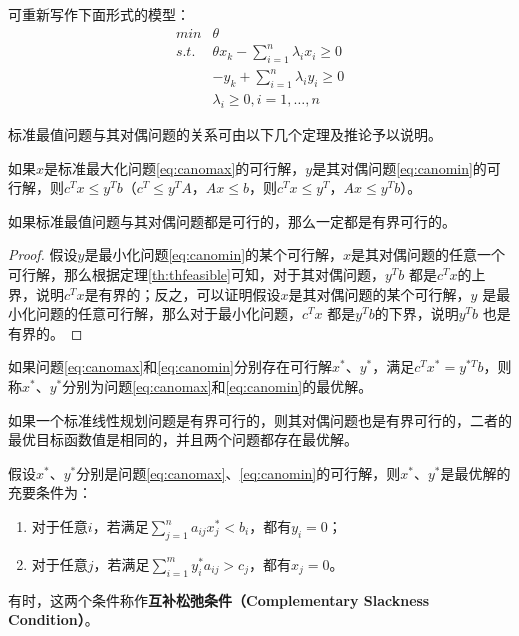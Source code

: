 \begin{shaded}
可重新写作下面形式的模型：
\begin{equation}
\begin{array}{ll}
  \textit{min} & \theta\\
  \textit{s.t.} & \theta x_k - \sum\limits_{i = 1}^n \lambda_i x_i \ge 0 \\
   & -y_k + \sum\limits_{i = 1}^n \lambda_i y_i \ge 0\\
   & \lambda_i \ge 0, i = 1, \ldots, n
\end{array}
\end{equation}
\end{shaded}

标准最值问题与其对偶问题的关系可由以下几个定理及推论予以说明。

\begin{theorem}\label{th:thfeasible}
如果$x$是标准最大化问题\eqref{eq:canomax}的可行解，$y$是其对偶问题\eqref{eq:canomin}的可行解，则$c^T x\le y^T b$（$c^T\le y^T A$，$Ax\le b$，则$c^T x\le y^T$，$Ax\le y^T b$）。
\end{theorem}

\begin{theorem}
如果标准最值问题与其对偶问题都是可行的，那么一定都是有界可行的。
\end{theorem}

\begin{proof}
假设$y$是最小化问题\eqref{eq:canomin}的某个可行解，$x$是其对偶问题的任意一个可行解，那么根据定理\ref{th:thfeasible}可知，对于其对偶问题，$y^T b$ 都是$c^T x$的上界，说明$c^T x$是有界的；反之，可以证明假设$x$是其对偶问题的某个可行解，$y$ 是最小化问题的任意可行解，那么对于最小化问题，$c^T x$ 都是$y^T b$的下界，说明$y^T b$ 也是有界的。
\end{proof}

\begin{theorem}\label{th:optimal}
如果问题\eqref{eq:canomax}和\eqref{eq:canomin}分别存在可行解$x^*$、$y^*$，满足$c^T x^*=y^{*T} b$，则称$x^*$、$y^*$分别为问题\eqref{eq:canomax}和\eqref{eq:canomin}的最优解。
\end{theorem}

\begin{theorem}[对偶定理]\label{th:duality}
如果一个标准线性规划问题是有界可行的，则其对偶问题也是有界可行的，二者的最优目标函数值是相同的，并且两个问题都存在最优解。
\end{theorem}

\begin{theorem}[均衡定理]
假设$x^*$、$y^*$分别是问题\eqref{eq:canomax}、\eqref{eq:canomin}的可行解，则$x^*$、$y^*$是最优解的充要条件为：

\begin{enumerate}
  \item 对于任意$i$，若满足$\sum\limits_{j=1}^n a_{ij} x_j^* < b_i$，都有$y_i=0$；
  \item 对于任意$j$，若满足$\sum\limits_{i=1}^m y_i^* a_{ij} > c_j$，都有$x_j=0$。
\end{enumerate}
有时，这两个条件称作\textbf{互补松弛条件（Complementary Slackness Condition）}。
\end{theorem}

